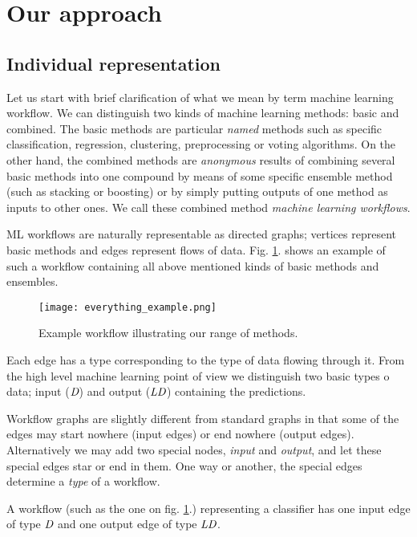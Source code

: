 \documentclass{ws-ijait}
\begin{document}
\section{Our approach}

\subsection{Individual representation}

Let us start with brief clarification of what we mean by term machine learning workflow. We can distinguish two kinds of machine learning methods: basic and combined. The basic methods are particular \textit{named} methods such as specific classification, regression, clustering, preprocessing or voting algorithms. On the other hand, the combined methods are \textit{anonymous} results of combining several basic methods into one compound by means of some specific ensemble method (such as stacking or boosting) or by simply putting outputs of one method as inputs to other ones. We call these combined method \textit{machine learning workflows}.

ML workflows are naturally representable as directed graphs; vertices represent basic methods and edges represent flows of data.
Fig. \ref{everything_example}. shows an example of such a workflow containing all above mentioned kinds of basic methods and ensembles.

\begin{figure}[th]
\centerline{\texttt{[image: everything\_example.png]}}
\vspace*{8pt}
\caption{Example workflow illustrating our range of methods.}
\label{everything_example}
\end{figure}

Each edge has a type corresponding to the type of data flowing through it. 
From the high level machine learning point of view we distinguish two basic types o data;
input \Dlong ($\textit{D}$) and output \LDlong ($\textit{LD}$) containing the predictions.

Workflow graphs are slightly different from standard graphs in that some of the edges may start nowhere (input edges) or end nowhere (output edges). 
Alternatively we may add two special nodes, \textit{input} and \textit{output}, and let these special edges star or end in them.
One way or another, the special edges determine a \textit{type} of a workflow.

A workflow (such as the one on fig. \ref{everything_example}.) representing a classifier has one input edge of type $\textit{D}$ and one output edge of type $\textit{LD}$.
\end{document}
